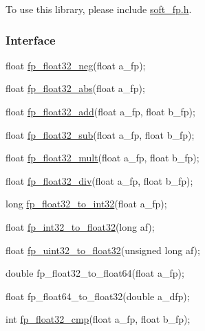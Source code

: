 To use this library, please include {\ttfamily \mbox{\hyperlink{a00023}{soft\+\_\+fp.\+h}}}.

\subsubsection*{Interface}


\begin{DoxyCode}
\textcolor{keywordtype}{float} \mbox{\hyperlink{a00023_a4702619cb8ca993b69919e1d7ca71f57}{fp\_float32\_neg}}(\textcolor{keywordtype}{float} a\_fp);

\textcolor{keywordtype}{float} \mbox{\hyperlink{a00023_a50dbb1be8035ed17c71df34d180056e0}{fp\_float32\_abs}}(\textcolor{keywordtype}{float} a\_fp);

\textcolor{keywordtype}{float} \mbox{\hyperlink{a00023_a05d59640c2e2b66e3f13e423c0779ce9}{fp\_float32\_add}}(\textcolor{keywordtype}{float} a\_fp, \textcolor{keywordtype}{float} b\_fp);

\textcolor{keywordtype}{float} \mbox{\hyperlink{a00023_a131916cff95f607242ea6affe3e50382}{fp\_float32\_sub}}(\textcolor{keywordtype}{float} a\_fp, \textcolor{keywordtype}{float} b\_fp);

\textcolor{keywordtype}{float} \mbox{\hyperlink{a00023_a4fb177861851cf018559768551298993}{fp\_float32\_mult}}(\textcolor{keywordtype}{float} a\_fp, \textcolor{keywordtype}{float} b\_fp);

\textcolor{keywordtype}{float} \mbox{\hyperlink{a00023_a02a02cf636799092e56f66a57d90d91b}{fp\_float32\_div}}(\textcolor{keywordtype}{float} a\_fp, \textcolor{keywordtype}{float} b\_fp);

\textcolor{keywordtype}{long} \mbox{\hyperlink{a00023_aab3c64f665ae99d4f267aef56d96be03}{fp\_float32\_to\_int32}}(\textcolor{keywordtype}{float} a\_fp);

\textcolor{keywordtype}{float} \mbox{\hyperlink{a00023_a13d2d336c17fa7ca9867415d017039f9}{fp\_int32\_to\_float32}}(\textcolor{keywordtype}{long} af);

\textcolor{keywordtype}{float} \mbox{\hyperlink{a00023_a096ed4a261247431549a71225761fffc}{fp\_uint32\_to\_float32}}(\textcolor{keywordtype}{unsigned} \textcolor{keywordtype}{long} af);

\textcolor{keywordtype}{double} fp\_float32\_to\_float64(\textcolor{keywordtype}{float} a\_fp);

\textcolor{keywordtype}{float} fp\_float64\_to\_float32(\textcolor{keywordtype}{double} a\_dfp);

\textcolor{keywordtype}{int} \mbox{\hyperlink{a00023_a55ee0ff6cc8f2a97c7079024577d33d3}{fp\_float32\_cmp}}(\textcolor{keywordtype}{float} a\_fp, \textcolor{keywordtype}{float} b\_fp);


\end{DoxyCode}
